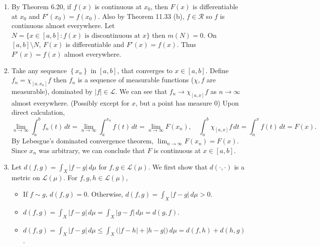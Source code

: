 \documentclass[12pt]{report}
\newcommand{\numl}[1]{\item[\large\textbf{\sffamily #1.}]}
\newcommand{\ds}{\displaystyle}
\newcommand{\mc}[1]{\mathcal{#1}}
\newcommand{\bs}{\setminus}
\newcommand{\abs}[1]{\left| #1 \right|}
\newcommand{\seq}[1]{\left\{ #1 \right\}}
\newcommand{\ra}{\rightarrow}
\renewcommand{\d}[1]{\,d{#1}}
\begin{document}
\begin{enumerate}
    \pagebreak

    \numl{3} By {\sffamily Theorem 6.20}, if \(f(x)\) is continuous at \(x_0\), then \(F(x)\) is differentiable at \(x_0\) and \(F'(x_0) = f(x_0)\). Also by {\sffamily Theorem 11.33 (b)}, \(f\in \mc{R}\) so \(f\) is continuous almost everywhere. Let \(N = \{x \in [a, b] : f(x) \text{ is discontinuous at } x\}\) then \(m(N) = 0\). On \([a, b] \bs N\), \(F(x)\) is differentiable and \(F'(x) = f(x)\). Thus \(F'(x) = f(x)\) almost everywhere.

    \numl{4} Take any sequence \(\seq{x_n}\) in \([a, b]\), that converges to \(x \in [a, b]\). Define \(f_n = \chi_{[a, x_n]}f\) then \(f_n\) is a sequence of measurable functions (\(\chi, f\) are measurable), dominated by \(\abs{f} \in \mc{L}\). We can see that \(f_n \ra \chi_{[a, x]}f\) as \(n \ra \infty\) almost everywhere. (Possibly except for \(x\), but a point has measure 0) Upon direct calculation,
    \[
        \lim_{n \ra \infty} \int_{a}^{b} f_n(t)\d{t} = \lim_{n \ra \infty} \int_{a}^{x_n} f(t)\d{t} = \lim_{n \ra \infty} F(x_n), \quad
        \int_{a}^{b} \chi_{[a, x]}f \d{t} = \int_{a}^{x}f(t)\d{t} = F(x).
    \]
    By Lebesgue's dominated convergence theorem, \(\ds \lim_{n \ra \infty} F(x_n) = F(x)\). Since \(x_n\) was arbitrary, we can conclude that \(F\) is continuous at \(x \in [a, b]\).

    \numl{5} Let \(d(f, g) = \int_X \abs{f - g} \d{\mu}\) for \(f, g \in \mc{L}(\mu)\). We first show that \(d(\cdot, \cdot)\) is a metric on \(\mc{L}(\mu)\). For \(f, g, h \in \mc{L}(\mu)\),
    \begin{itemize}
        \item If \(f \sim g\), \(d(f, g) = 0\). Otherwise, \(\ds d(f, g) = \int_X \abs{f - g} \d{\mu} > 0\).
        \item \(d(f, g) = \ds \int_X \abs{f - g} \d{\mu} = \int_X \abs{g - f} \d{\mu} = d(g, f)\).
        \item \(\ds d(f, g) = \int_X \abs{f - g} \d{\mu} \leq \int_X \bigl(\abs{f - h} + \abs{h - g}\bigr) \d{\mu} = d(f, h) + d(h, g)\).
    \end{itemize}


\end{enumerate}
\end{document}
